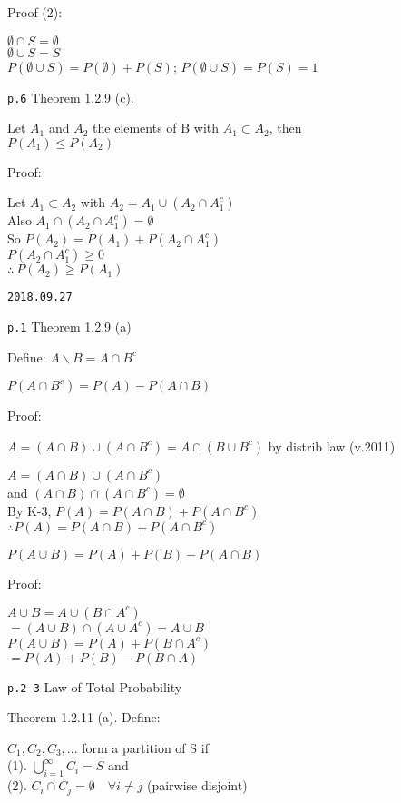 \documentclass[]{tufte-book}
\begin{document}
Proof (2):

\(\emptyset\cap S=\emptyset\)\\
\(\emptyset\cup S=S\)\\
\(P(\emptyset\cup S)=P(\emptyset)+P(S)\); \(P(\emptyset\cup S)=P(S)=1\)

\texttt{p.6} Theorem 1.2.9 (c).

Let \(A_{1}\) and \(A_{2}\) the elements of B with
\(A_{1}\subset A_{2}\), then\\
\(P(A_{1})\le P(A_{2})\)

Proof:

Let \(A_{1}\subset A_{2}\) with
\(A_{2}=A_{1}\cup (A_{2}\cap A_{1}^c)\)\\
Also \(A_{1}\cap(A_{2}\cap A_{1}^c)=\emptyset\)\\
So \(P(A_{2})=P(A_{1})+P(A_{2}\cap A_{1}^c)\)\\
\(P(A_{2}\cap A_{1}^c)\ge0\)\\
\(\therefore\ P(A_{2})\ge P(A_{1})\)

\texttt{2018.09.27}

\texttt{p.1} Theorem 1.2.9 (a)

Define: \(A\backslash B =A\cap B^c\)

\(P(A\cap B^c)=P(A)-P(A\cap B)\)

Proof:

\(A=(A\cap B)\cup(A\cap B^c)=A\cap(B\cup B^c)\) by distrib law (v.2011)

\(A=(A\cap B)\cup(A\cap B^c)\)\\
and \((A\cap B)\cap (A\cap B^c)=\emptyset\)\\
By K-3, \(P(A)=P(A\cap B)+P(A\cap B^c)\)\\
\(\therefore P(A)=P(A\cap B)+P(A\cap B^c)\)

\(P(A\cup B)=P(A)+P(B)-P(A\cap B)\)

Proof:

\(A\cup B=A\cup(B\cap A^c)\)\\
\(=(A\cup B)\cap(A\cup A^c)=A\cup B\)\\
\(P(A\cup B)=P(A)+ P(B\cap A^c)\)\\
\(=P(A)+P(B)-P(B\cap A)\)

\texttt{p.2-3} Law of Total Probability

Theorem 1.2.11 (a). Define:

\(C_{1},C_{2},C_{3},...\) form a partition of S if\\
(1). \(\bigcup_{i=1}^\infty C_i=S\) and\\
(2). \(C_{i}\cap C_{j}=\emptyset \quad \forall i\ne j\) (pairwise
disjoint)
\end{document}

